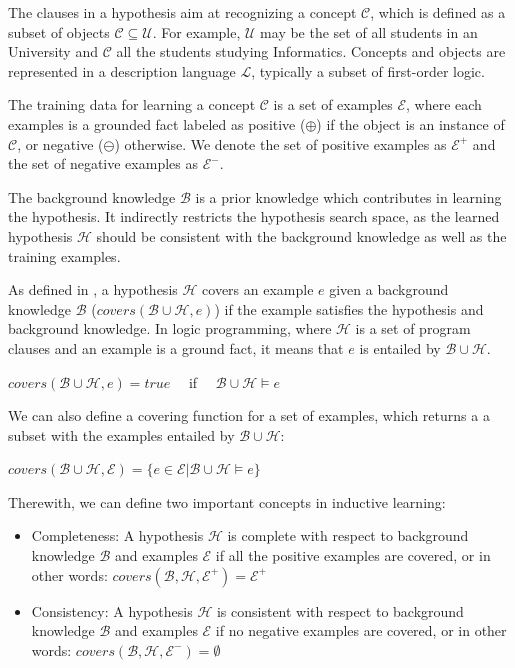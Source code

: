 The clauses in a hypothesis aim at recognizing a concept $\mathcal{C}$, which is defined as a subset of objects
$\mathcal{C} \subseteq \mathcal{U}$. For example, $\mathcal{U}$ may be the set of all students in an University and
$\mathcal{C}$ all the students studying Informatics. Concepts and objects are represented in a description language
$\mathcal{L}$, typically a subset of first-order logic.

The training data for learning a concept $\mathcal{C}$ is a set of examples $\mathcal{E}$, where each examples is a
grounded fact labeled as positive ($\oplus$) if the object is an instance of $\mathcal{C}$, or negative ($\ominus$)
otherwise. We denote the set of positive examples as $\mathcal{E}^{+}$ and the set of negative examples as
$\mathcal{E}^{-}$.

The background knowledge $\mathcal{B}$ is a prior knowledge which contributes in learning the hypothesis. It
indirectly
restricts the hypothesis search space, as  the learned hypothesis $\mathcal{H}$ should be consistent with the
background
knowledge as well as the training examples.

As defined in \citet{DBLP:journals/ml/LavracD96}, a hypothesis $\mathcal{H}$ covers an example $e$ given a
background knowledge $\mathcal{B}$ ($covers(\mathcal{B} \cup \mathcal{H},e)$) if the example satisfies the hypothesis
and background knowledge. In logic programming, where $\mathcal{H}$ is a set of program clauses and an example is a
ground fact, it means that $e$ is entailed by $\mathcal{B} \cup \mathcal{H}$.

\begin{center}
 $covers(\mathcal{B} \cup \mathcal{H},e)=true \quad$ if $\quad \mathcal{B} \cup \mathcal{H} \models e$
\end{center}

We can also define a covering function for a set of examples, which returns a a subset with the examples entailed by
$\mathcal{B} \cup \mathcal{H}$:

\begin{center}
 $covers(\mathcal{B} \cup \mathcal{H},\mathcal{E})=\{e \in \mathcal{E} | \mathcal{B} \cup \mathcal{H} \models e\}$
\end{center}

Therewith, we can define two important concepts in inductive learning:

\begin{itemize}
 \item Completeness: A hypothesis $\mathcal{H}$ is complete with respect to background knowledge $\mathcal{B}$ and
examples $\mathcal{E}$ if all the positive examples are covered, or in other words:
$covers(\mathcal{B},\mathcal{H},\mathcal{E}^{+})=\mathcal{E}^{+}$
 \item Consistency: A hypothesis $\mathcal{H}$ is consistent with respect to background knowledge $\mathcal{B}$ and
examples $\mathcal{E}$ if no negative examples are covered, or in other words:
$covers(\mathcal{B},\mathcal{H},\mathcal{E}^{-})=\emptyset$
\end{itemize}

